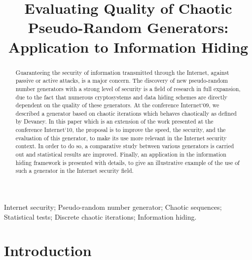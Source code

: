 \documentclass[journal]{IEEEtran}
\begin{document}
\title{Evaluating Quality of Chaotic Pseudo-Random Generators: Application to Information Hiding}
\author{
}
\maketitle
\thispagestyle{empty}

\begin{abstract}
Guaranteeing the security of information transmitted through the Internet, against passive or active attacks, is a major concern. 
The discovery of new pseudo-random number generators with a strong level of security is a field of research in full expansion, due to the fact that numerous cryptosystems and data hiding schemes are directly dependent on the quality of these generators.
At the conference Internet`09, we described a generator based on chaotic iterations which behaves chaotically as defined by Devaney. In this paper which is an extension of the work presented at the conference Internet`10, the proposal is to improve the speed, the security, and the evaluation of this generator, to make its use more relevant in the Internet security context. In order to do so, a comparative study between various generators is carried out and statistical results are improved. Finally, an application in the information hiding framework is presented with details, to give an illustrative example of the use of such a generator in the Internet security field. 
\end{abstract}
\begin{IEEEkeywords}
Internet security; Pseudo-random number generator; Chaotic sequences; Statistical tests; Discrete chaotic iterations; Information hiding.

\end{IEEEkeywords}
\IEEEpeerreviewmaketitle

\section{Introduction}
\end{document}
